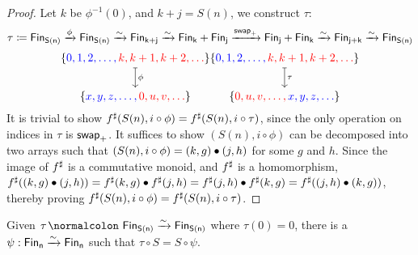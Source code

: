 \begin{proof}
    Let $k$ be $\phi^{-1}(0)$, and $k + j = S(n)$, we construct $\tau$:
    \[
        \tau \defeq \Fin[S(n)] \xto{\phi} \Fin[S(n)] \xto{\sim} \Fin[k+j] \xto{\sim} \Fin[k] + \Fin[j]
        \xto{\term{swap}_{+}} \Fin[j] + \Fin[k] \xto{\sim} \Fin[j+k] \xto{\sim} \Fin[S(n)]
    \]
    \[
        \begin{tikzcd}[ampersand replacement=\&,cramped]
            {\{\color{blue}0, 1, 2, \dots, \color{red}k, k+1, k+2, \dots \color{black}\}} \\
            {\{\color{blue}x, y, z, \dots, \color{red}0, u, v, \dots \color{black}\}}
            \arrow["\phi", maps to, from=1-1, to=2-1]
        \end{tikzcd}
        \\
        \begin{tikzcd}[ampersand replacement=\&,cramped]
            {\{\color{blue}0, 1, 2, \dots, \color{red}k, k+1, k+2, \dots \color{black}\}} \\
            {\{\color{red}0, u, v, \dots, \color{blue}x, y, z, \dots \color{black}\}}
            \arrow["\tau", maps to, from=1-1, to=2-1]
        \end{tikzcd}
    \]
    It is trivial to show ${f}^{\sharp}(S(n), i \circ \phi) = {f}^{\sharp}(S(n), i \circ \tau)$, since the only
    operation on indices in $\tau$ is $\operatorname{\mathsf{swap}}_{+}$. It suffices to show $(S(n), i \circ \phi)$
    can be decomposed into two arrays such that $(S(n), i \circ \phi) = (k, g) \mathbin{\bullet} (j, h)$
    for some $g$ and $h$. Since the image of ${f}^{\sharp}$ is a commutative monoid, and ${f}^{\sharp}$ is a homomorphism,
    ${f}^{\sharp}((k, g) \mathbin{\bullet} (j, h)) = {f}^{\sharp}(k, g) \mathbin{\bullet} {f}^{\sharp}(j, h) = {f}^{\sharp}(j, h) \mathbin{\bullet} {f}^{\sharp}(k, g) =
        {f}^{\sharp}((j, h) \mathbin{\bullet} (k, g))$, thereby proving ${f}^{\sharp}(S(n), i \circ \phi) = {f}^{\sharp}(S(n), i \circ \tau)$.

\end{proof}

\begin{lemma}
    \label{bag:punch}
    Given $\tau\colon \Fin[S(n)]\xto{\sim}\Fin[S(n)]$ where $\tau(0) = 0$,
    there is a $\psi : \Fin[n] \xto{\sim} \Fin[n]$ such that $\tau \circ S = S \circ \psi$.
\end{lemma}

